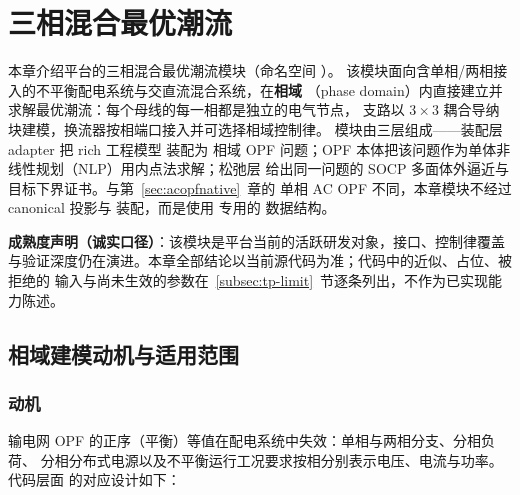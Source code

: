 \section{三相混合最优潮流}\label{sec:threephase}

本章介绍平台的三相混合最优潮流模块（命名空间 ）。
该模块面向含单相/两相接入的不平衡配电系统与交直流混合系统，在\textbf{相域}
（phase domain）内直接建立并求解最优潮流：每个母线的每一相都是独立的电气节点，
支路以 $3\times 3$ 耦合导纳块建模，换流器按相端口接入并可选择相域控制律。
模块由三层组成——装配层 adapter 把 rich 工程模型  装配为
相域 OPF 问题；OPF 本体把该问题作为单体非线性规划（NLP）用内点法求解；松弛层
给出同一问题的 SOCP 多面体外逼近与目标下界证书。与第~\ref{sec:acopfnative}~章的
单相 AC OPF 不同，本章模块不经过 canonical 投影与  装配，而是使用
专用的  数据结构。

\textbf{成熟度声明（诚实口径）}：该模块是平台当前的活跃研发对象，接口、控制律覆盖
与验证深度仍在演进。本章全部结论以当前源代码为准；代码中的近似、占位、被拒绝的
输入与尚未生效的参数在~\ref{subsec:tp-limit}~节逐条列出，不作为已实现能力陈述。

\subsection{相域建模动机与适用范围}

\subsubsection*{动机}
输电网 OPF 的正序（平衡）等值在配电系统中失效：单相与两相分支、分相负荷、
分相分布式电源以及不平衡运行工况要求按相分别表示电压、电流与功率。代码层面
的对应设计如下：

